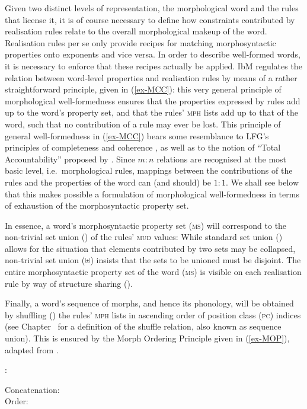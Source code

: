 \documentclass[output=paper
 	        ,biblatex
                ,babelshorthands
                ,newtxmath
                ,draftmode
                ,colorlinks, citecolor=brown
]{langscibook}
\begin{document}
\begin{exe}
\begin{xlist}
Given two distinct levels of representation, the morphological word
and the rules that license it, it is of course necessary to define how
constraints contributed by realisation rules relate to the overall
morphological makeup of the word. Realisation rules per se only
provide recipes for matching morphosyntactic properties onto exponents
and vice versa. In order to describe well-formed words, it is
necessary to enforce that these recipes actually be applied. IbM
regulates the relation between word-level properties and realisation
rules by means of a rather straightforward principle, given in
(\ref{ex-MCC}): this very general principle of morphological
well-formedness ensures that the properties expressed by rules add up
to the word's property set, and that the rules' \textsc{mph} lists add
up to that of the word, such that no contribution of a rule may ever
be lost. This principle of general well-formedness in
(\ref{ex-MCC}) bears some resemblance to LFG's principles of
completeness and coherence \citep{bresnan_j82}, as well as to the
notion of ``Total Accountability'' proposed by \citet{Hockett47}. Since
$m:n$ relations are recognised at the most basic level,
i.e.\ morphological rules, mappings between the contributions of the
rules and the properties of the word can (and should) be $1:1$.  We
shall see below that this makes possible a formulation of morphological
well-formedness in terms of exhaustion of the morphosyntactic property
set.

In essence, a word's morphosyntactic property set (\textsc{ms}) will
correspond to the non-trivial set union (\isi{$\uplus$}) of the rules'
\textsc{mud} values: While standard set union (\isi{$\cup$}) allows for the
situation that elements contributed by two sets may be collapsed,
non-trivial set union ($\uplus$) insists that the sets to be unioned
must be disjoint.  The entire morphosyntactic property set of the word
(\textsc{ms}) is visible on each realisation rule by way of structure
sharing ().

Finally, a word's sequence of morphs, and hence its phonology, will
be obtained by shuffling (\isi{$\bigcirc$}) the rules' \textsc{mph} lists in
ascending order of position class (\textsc{pc}) indices (see
Chapter~\crossrefchaptert[\page \pageref{rel-shuffle}]{order} for a definition of the shuffle
relation, also known as
sequence union). This is ensured by the Morph
Ordering Principle given in (\ref{ex-MOP}), adapted from
\citet{Crysmann:Bonami:2016}.

\begin{exe}
  \ex\label{ex-MOP}
:
\begin{xlist}
\ex Concatenation:\\
\ex Order:\\
\zl


\end{xlist}
\end{exe}
\end{xlist}
\end{exe}
\end{document}
